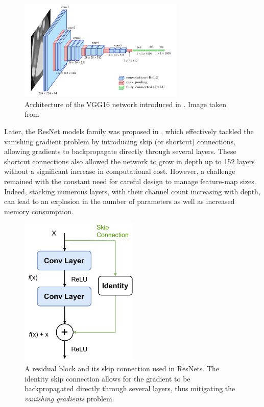 \begin{figure}[htbp]
  \centering
  \includegraphics[width=0.7\textwidth]{chapter_sota/assets/vgg16.png}
  \caption{Architecture of the VGG16 network introduced in
    \cite{DBLP:journals/corr/SimonyanZ14a}. Image taken from
    \cite{ferguson2017automatic}}
  \label{fig:dlo:vgg16}
\end{figure}

Later, the ResNet models family was proposed in \cite{DBLP:conf/cvpr/HeZRS16},
which effectively tackled the vanishing gradient problem by introducing skip (or
shortcut) connections, allowing gradients to backpropagate directly through
several layers. These shortcut connections also allowed the network to grow in
depth up to 152 layers without a significant increase in computational cost.
However, a challenge remained with the constant need for careful design to
manage feature-map sizes. Indeed, stacking numerous layers, with their channel
count increasing with depth, can lead to an explosion in the number of
parameters as well as increased memory consumption.\\

\begin{figure}[htbp]
  \centering
  \includegraphics[width=0.5\textwidth]{chapter_dlo/assets/skip_connection.pdf}
  \caption{A residual block and its skip connection used in
    ResNets\cite{DBLP:conf/cvpr/HeZRS16}. The identity skip connection allows
    for the gradient to be backpropagated directly through several layers, thus
    mitigating the \emph{vanishing gradients} problem.}
  \label{fig:dlo:skip_connection}
\end{figure}

